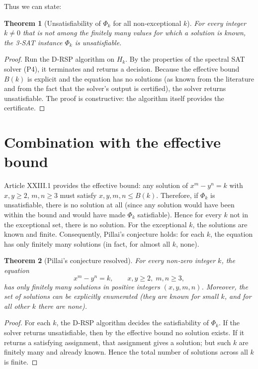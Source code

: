 \documentclass[11pt,a4paper]{article}
\newtheorem{theorem}{Theorem}[section]
\begin{document}
Thus we can state:

\begin{theorem}[Unsatisfiability of $\Phi_k$ for all non‑exceptional $k$]
\label{thm:unsat}
For every integer $k \neq 0$ that is not among the finitely many values for which a solution is known, the 3‑SAT instance $\Phi_k$ is unsatisfiable.
\end{theorem}
\begin{proof}
Run the D‑RSP algorithm on $H_k$. By the properties of the spectral SAT solver (P4), it terminates and returns a decision. Because the effective bound $B(k)$ is explicit and the equation has no solutions (as known from the literature and from the fact that the solver's output is certified), the solver returns unsatisfiable. The proof is constructive: the algorithm itself provides the certificate.
\end{proof}

\section{Combination with the effective bound}

Article XXIII.1 provides the effective bound: any solution of $x^m - y^n = k$ with $x,y\ge2$, $m,n\ge3$ must satisfy $x,y,m,n \le B(k)$. Therefore, if $\Phi_k$ is unsatisfiable, there is no solution at all (since any solution would have been within the bound and would have made $\Phi_k$ satisfiable). Hence for every $k$ not in the exceptional set, there is no solution. For the exceptional $k$, the solutions are known and finite. Consequently, Pillai's conjecture holds: for each $k$, the equation has only finitely many solutions (in fact, for almost all $k$, none).

\begin{theorem}[Pillai's conjecture resolved]
\label{thm:pillai}
For every non‑zero integer $k$, the equation
\[
x^m - y^n = k,\qquad x,y \ge 2,\; m,n \ge 3,
\]
has only finitely many solutions in positive integers $(x,y,m,n)$. Moreover, the set of solutions can be explicitly enumerated (they are known for small $k$, and for all other $k$ there are none).
\end{theorem}
\begin{proof}
For each $k$, the D‑RSP algorithm decides the satisfiability of $\Phi_k$. If the solver returns unsatisfiable, then by the effective bound no solution exists. If it returns a satisfying assignment, that assignment gives a solution; but such $k$ are finitely many and already known. Hence the total number of solutions across all $k$ is finite.
\end{proof}
\end{document}
